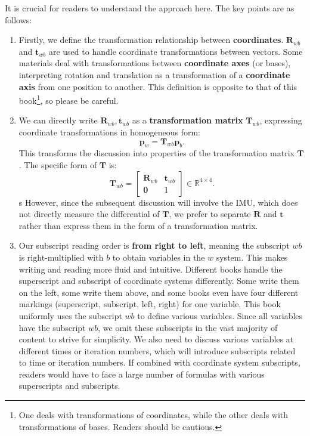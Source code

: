 It is crucial for readers to understand the approach here. The key points are as follows:
\begin{enumerate}
	\item Firstly, we define the transformation relationship between \textbf{coordinates}. $\mathbf{R}_{wb}$ and $\mathbf{t}_{wb}$ are used to handle coordinate transformations between vectors. Some materials deal with transformations between \textbf{coordinate axes} (or bases), interpreting rotation and translation as a transformation of a \textbf{coordinate axis} from one position to another. This definition is opposite to that of this book\footnote{One deals with transformations of coordinates, while the other deals with transformations of bases. Readers should be cautious.}, so please be careful.
	\item We can directly write $\mathbf{R}_{wb}, \mathbf{t}_{wb}$ as a \textbf{transformation matrix} $\mathbf{T}_{wb}$, expressing coordinate transformations in homogeneous form:
	\begin{equation}
		\mathbf{p}_w = \mathbf{T}_{wb} \mathbf{p}_{b}.
	\end{equation}
	This transforms the discussion into properties of the transformation matrix $\mathbf{T}$. The specific form of $\mathbf{T}$ is:
	\begin{equation}
		\mathbf{T}_{wb} = \begin{bmatrix}
			\mathbf{R}_{wb} & \mathbf{t}_{wb} \\
			\mathbf{0} & 1
		\end{bmatrix} \in \mathbb{R}^{4 \times 4}.
	\end{equation}s
	However, since the subsequent discussion will involve the IMU, which does not directly measure the differential of $\mathbf{T}$, we prefer to separate $\mathbf{R}$ and $\mathbf{t}$ rather than express them in the form of a transformation matrix.
	\item Our subscript reading order is \textbf{from right to left}, meaning the subscript $wb$ is right-multiplied with $b$ to obtain variables in the $w$ system. This makes writing and reading more fluid and intuitive. Different books handle the superscript and subscript of coordinate systems differently. Some write them on the left, some write them above, and some books even have four different markings (superscript, subscript, left, right) for one variable. This book uniformly uses the subscript $wb$ to define various variables. Since all variables have the subscript $wb$, we omit these subscripts in the vast majority of content to strive for simplicity. We also need to discuss various variables at different times or iteration numbers, which will introduce subscripts related to time or iteration numbers. If combined with coordinate system subscripts, readers would have to face a large number of formulas with various superscripts and subscripts.
\end{enumerate}

